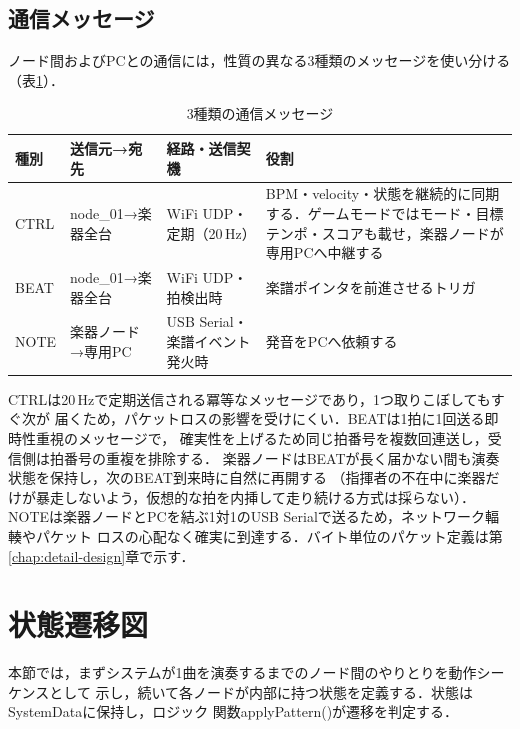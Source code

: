 \documentclass[lualatex,book,paper=a4paper,jafontsize=11.5pt,jafontscale=1.05]{jlreq}
\begin{document}
\subsection{通信メッセージ}
ノード間およびPCとの通信には，性質の異なる3種類のメッセージを使い分ける
（表\ref{tab:msg-policy}）．
\begin{table}[H]\centering
  \caption{3種類の通信メッセージ}\label{tab:msg-policy}
  \small
  \begin{tabularx}{\linewidth}{l >{\raggedright\arraybackslash}p{3.2cm} >{\raggedright\arraybackslash}p{3.0cm} X}
    \toprule
    種別 & 送信元→宛先 & 経路・送信契機 & 役割 \\
    \midrule
    CTRL & node\_01→楽器全台 & WiFi UDP・定期（20\,Hz） & BPM・velocity・状態を継続的に同期する．ゲームモードではモード・目標テンポ・スコアも載せ，楽器ノードが専用PCへ中継する \\
    BEAT & node\_01→楽器全台 & WiFi UDP・拍検出時 & 楽譜ポインタを前進させるトリガ \\
    NOTE & 楽器ノード→専用PC & USB Serial・楽譜イベント発火時 & 発音をPCへ依頼する \\
    \bottomrule
  \end{tabularx}
\end{table}
CTRLは20\,Hzで定期送信される冪等なメッセージであり，1つ取りこぼしてもすぐ次が
届くため，パケットロスの影響を受けにくい．BEATは1拍に1回送る即時性重視のメッセージで，
確実性を上げるため同じ拍番号を複数回連送し，受信側は拍番号の重複を排除する．
楽器ノードはBEATが長く届かない間も演奏状態を保持し，次のBEAT到来時に自然に再開する
（指揮者の不在中に楽器だけが暴走しないよう，仮想的な拍を内挿して走り続ける方式は採らない）．
NOTEは楽器ノードとPCを結ぶ1対1のUSB Serialで送るため，ネットワーク輻輳やパケット
ロスの心配なく確実に到達する．バイト単位のパケット定義は第\ref{chap:detail-design}章で示す．

\section{状態遷移図}\label{sec:basic-state}

本節では，まずシステムが1曲を演奏するまでのノード間のやりとりを動作シーケンスとして
示し，続いて各ノードが内部に持つ状態を定義する．状態はSystemDataに保持し，ロジック
関数applyPattern()が遷移を判定する．
\end{document}
